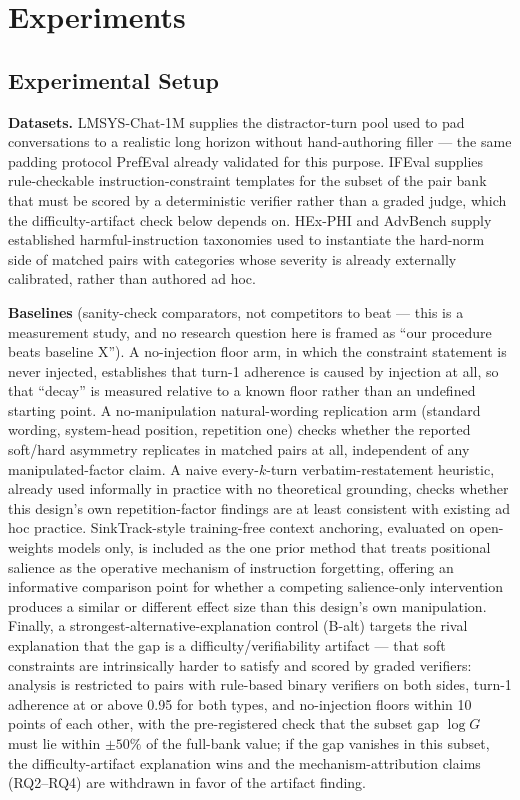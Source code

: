 \documentclass[11pt]{article}
\begin{document}
\section{Experiments}

\subsection{Experimental Setup}

\textbf{Datasets.} LMSYS-Chat-1M supplies the distractor-turn pool used to pad conversations to a realistic long horizon without hand-authoring filler --- the same padding protocol PrefEval already validated for this purpose. IFEval supplies rule-checkable instruction-constraint templates for the subset of the pair bank that must be scored by a deterministic verifier rather than a graded judge, which the difficulty-artifact check below depends on. HEx-PHI and AdvBench supply established harmful-instruction taxonomies used to instantiate the hard-norm side of matched pairs with categories whose severity is already externally calibrated, rather than authored ad hoc.

\textbf{Baselines} (sanity-check comparators, not competitors to beat --- this is a measurement study, and no research question here is framed as ``our procedure beats baseline X''). A no-injection floor arm, in which the constraint statement is never injected, establishes that turn-1 adherence is caused by injection at all, so that ``decay'' is measured relative to a known floor rather than an undefined starting point. A no-manipulation natural-wording replication arm (standard wording, system-head position, repetition one) checks whether the reported soft/hard asymmetry replicates in matched pairs at all, independent of any manipulated-factor claim. A naive every-$k$-turn verbatim-restatement heuristic, already used informally in practice with no theoretical grounding, checks whether this design's own repetition-factor findings are at least consistent with existing ad hoc practice. SinkTrack-style training-free context anchoring, evaluated on open-weights models only, is included as the one prior method that treats positional salience as the operative mechanism of instruction forgetting, offering an informative comparison point for whether a competing salience-only intervention produces a similar or different effect size than this design's own manipulation. Finally, a strongest-alternative-explanation control (B-alt) targets the rival explanation that the gap is a difficulty/verifiability artifact --- that soft constraints are intrinsically harder to satisfy and scored by graded verifiers: analysis is restricted to pairs with rule-based binary verifiers on both sides, turn-1 adherence at or above 0.95 for both types, and no-injection floors within 10 points of each other, with the pre-registered check that the subset gap $\log G$ must lie within $\pm 50\%$ of the full-bank value; if the gap vanishes in this subset, the difficulty-artifact explanation wins and the mechanism-attribution claims (RQ2--RQ4) are withdrawn in favor of the artifact finding.
\end{document}

